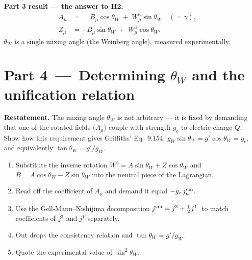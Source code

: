 \documentclass[11pt]{article}
\begin{document}
\begin{resultbox}
\textbf{Part 3 result --- the answer to H2.}
\[
\boxed{\;\;
\begin{aligned}
A_\mu &= \phantom{-}B_\mu \cos\theta_W \;+\; W^3_\mu \sin\theta_W \quad(=\gamma), \\[3pt]
Z_\mu &= -B_\mu \sin\theta_W \;+\; W^3_\mu \cos\theta_W .
\end{aligned}
\;\;}
\]
$\theta_W$ is a single mixing angle (the Weinberg angle), measured experimentally.
\end{resultbox}

\newpage

\section*{Part 4 \,---\, Determining $\theta_W$ and the unification relation}

\begin{problembox}
\textbf{Restatement.} The mixing angle $\theta_W$ is not arbitrary --- it is fixed by
demanding that one of the rotated fields ($A_\mu$) couple with strength $g_e$ to electric
charge $Q$. Show how this requirement gives Griffiths' Eq.~9.154:
$g_W \sin\theta_W = g' \cos\theta_W = g_e$, and equivalently $\tan\theta_W = g'/g_W$.
\end{problembox}

\begin{deliverbox}
\begin{enumerate}[leftmargin=*]
  \item Substitute the inverse rotation $W^3 = A \sin\theta_W + Z \cos\theta_W$ and
        $B = A \cos\theta_W - Z \sin\theta_W$ into the neutral piece of the Lagrangian.
  \item Read off the coefficient of $A_\mu$ and demand it equal $-g_e\, j^{\rm em}_\mu$.
  \item Use the Gell-Mann--Nishijima decomposition $j^{\rm em} = j^3 + \tfrac{1}{2} j^Y$ to
        match coefficients of $j^3$ and $j^Y$ separately.
  \item Out drops the consistency relation and $\tan\theta_W = g'/g_W$.
  \item Quote the experimental value of $\sin^2\theta_W$.
\end{enumerate}
\end{deliverbox}
\end{document}
